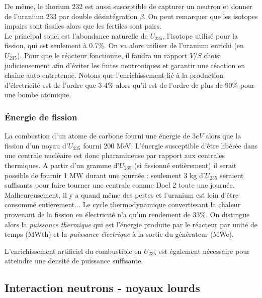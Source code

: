 De même, le thorium 232 est aussi susceptible de capturer un neutron et donner de l'uranium 233 par 
double désintégration $\beta$. On peut remarquer que les isotopes impairs sont fissiles alors que les
fertiles sont pairs.\\

Le principal souci est l'abondance naturelle de $U_{235}$, l'isotope utilisé pour la fission, qui est seulement à 0.7\%. 
On va alors utiliser de l'uranium enrichi (en $U_{235}$). Pour que le réacteur fonctionne, il faudra un rapport $V/S$ 
choisi judicieusement afin d'éviter les fuites neutroniques et garantir une réaction en chaîne auto-entretenue. Notons 
que l'enrichissement lié à la production d'électricité est de l'ordre que 3-4\% alors qu'il est de l'ordre de
plus de 90\% pour une bombe atomique.

\subsubsection{Énergie de fission}
La combustion d'un atome de carbone fourni une énergie de $3eV$ alors que la fission d'un noyau 
d'$U_{235}$ fourni 200 MeV. L'énergie susceptible d'être libérée dans une centrale nucléaire est donc pharamineuse par rapport 
aux centrales thermiques. A partir d'un gramme d'$U_{235}$ (si fissionné entièrement) il serait possible 
de fournir  1 MW durant une journée : seulement 3 kg d'$U_{235}$ seraient suffisants pour faire tourner 
une centrale comme Doel 2 toute une journée.\\

Malheureusement, il y a quand même des pertes et l'uranium est loin d'être consommé entièrement... 
Le cycle thermodynamique convertissant la chaleur provenant de la fission en électricité n'a qu'un rendement de 33\%.
On distingue alors la \textit{puissance thermique} qui est l'énergie produite par le réacteur par unité de temps (MWth)
et la \textit{puissance électrique} à la sortie du générateur (MWe).

L'enrichissement artificiel du combustible en $U_{235}$ est également nécessaire pour atteindre une densité de puissance suffisante.


\subsection{Interaction neutrons - noyaux lourds}
